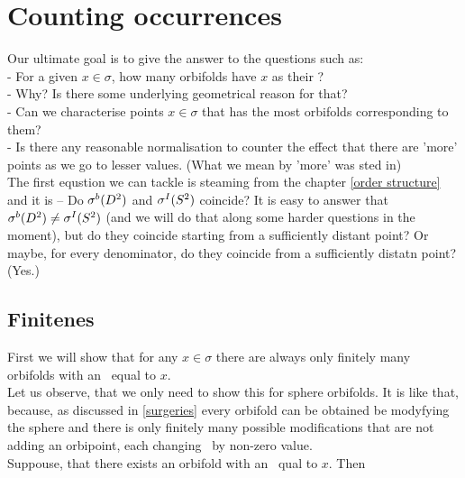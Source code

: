 \chapter{Counting occurrences} \label{counting occurrences}
Our ultimate goal is to give the answer to the questions such as: \\
- For a given $x \in \sigma$, how many orbifolds have $x$ as their \Eoc?\\
- Why? Is there some underlying geometrical reason for that?\\
- Can we characterise points $x \in \sigma$ that has the most orbifolds corresponding to them? \\
- Is there any reasonable normalisation to counter the effect that there are 'more' points as we go 
to lesser values. (What we mean by 'more' was sted in) \\
The first equstion we can tackle is steaming from the chapter \ref{order structure} 
and it is -- Do ${\mathcal{\sigma}^b(D^2)}$ and ${\mathcal{\sigma}^I(S^2)}$ coincide? It is easy to answer that ${\mathcal{\sigma}^b(D^2)} \neq {\mathcal{\sigma}^I(S^2)}$ 
(and we will do that along some harder questions in the moment), but do they coincide 
starting from a sufficiently distant point? Or maybe, for every denominator, do they coincide 
from a sufficiently distatn point? (Yes.) \\
\section{Finitenes}
First we will show that for any $x \in \sigma$ there are always only finitely many orbifolds 
with an \Eoc\ equal to $x$. \\ 
Let us observe, that we only need to show this for sphere orbifolds. It is like that, because, 
as discussed in \ref{surgeries} every orbifold can be obtained be modyfying the sphere and 
there is only finitely many possible modifications that are not adding an orbipoint, each 
changing \Eoc\ by non-zero value. \\ 

Suppouse, that there exists an orbifold with an \Eoc\ qual to $x$. Then 
